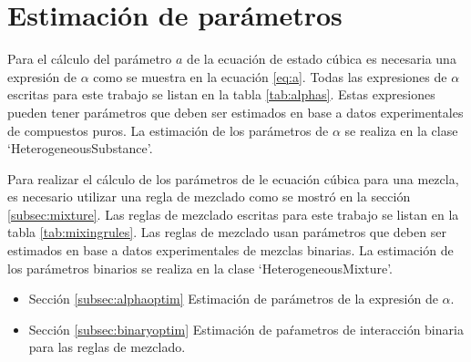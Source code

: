 \section{Estimación de parámetros}\label{sec:optimization}

	Para el cálculo del parámetro $a$ de la ecuación de estado cúbica es necesaria una expresión de $\alpha$ como se muestra en la ecuación \ref{eq:a}. Todas las expresiones de $\alpha$ escritas para este trabajo se listan en la tabla \ref{tab:alphas}. Estas expresiones pueden tener parámetros que deben ser estimados en base a datos experimentales de compuestos puros. La estimación de los parámetros de $\alpha$ se realiza en la clase `HeterogeneousSubstance'.

	Para realizar el cálculo de los parámetros de le ecuación cúbica para una mezcla, es necesario utilizar una regla de mezclado como se mostró en la sección \ref{subsec:mixture}. Las reglas de mezclado escritas para este trabajo se listan en la tabla \ref{tab:mixingrules}. Las reglas de mezclado usan parámetros que deben ser estimados en base a datos experimentales de mezclas binarias. La estimación de los parámetros binarios se realiza en la clase `HeterogeneousMixture'.

	\begin{itemize}
		\item{Sección} \ref{subsec:alphaoptim} Estimación de parámetros de la expresión de $\alpha$.
		\item{Sección} \ref{subsec:binaryoptim} Estimación de paŕametros de interacción binaria para las reglas de mezclado.
	\end{itemize}

	





